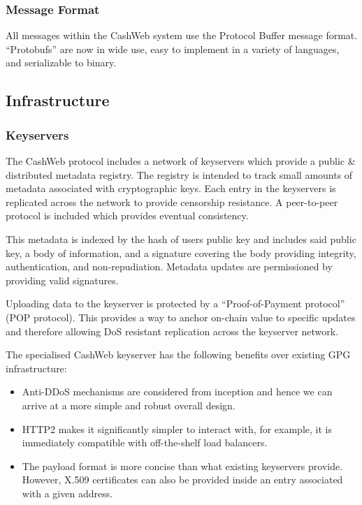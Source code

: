 \documentclass{article}
\begin{document}
\subsubsection{Message Format}

All messages within the CashWeb system use the Protocol Buffer\cite{protobufs} message format. ``Protobufs'' are now in wide use, easy to implement in a variety of languages, and serializable to binary.

\subsection{Infrastructure}

\subsubsection{Keyservers}

The CashWeb protocol includes a network of keyservers which provide a public \& distributed metadata registry. The registry is intended to track small amounts of metadata associated with cryptographic keys. Each entry in the keyservers is replicated across the network to provide censorship resistance. A peer-to-peer protocol is included which provides eventual consistency.

This metadata is indexed by the hash of users public key and includes said public key, a body of information, and a signature covering the body providing integrity, authentication, and non-repudiation. Metadata updates are permissioned by providing valid signatures.

Uploading data to the keyserver is protected by a ``Proof-of-Payment protocol'' (POP protocol). This provides a way to anchor on-chain value to specific updates and therefore allowing DoS resistant replication across the keyserver network.

The specialised CashWeb keyserver has the following benefits over existing GPG infrastructure:
\begin{itemize}
  \item Anti-DDoS mechanisms are considered from inception and hence we can arrive at a more simple and robust overall design.
  \item HTTP2 makes it significantly simpler to interact with, for example, it is immediately compatible with off-the-shelf load balancers.
  \item The payload format is more concise than what existing keyservers provide. However, X.509 certificates can also be provided inside an entry associated with a given address.
\end{itemize}
\end{document}

